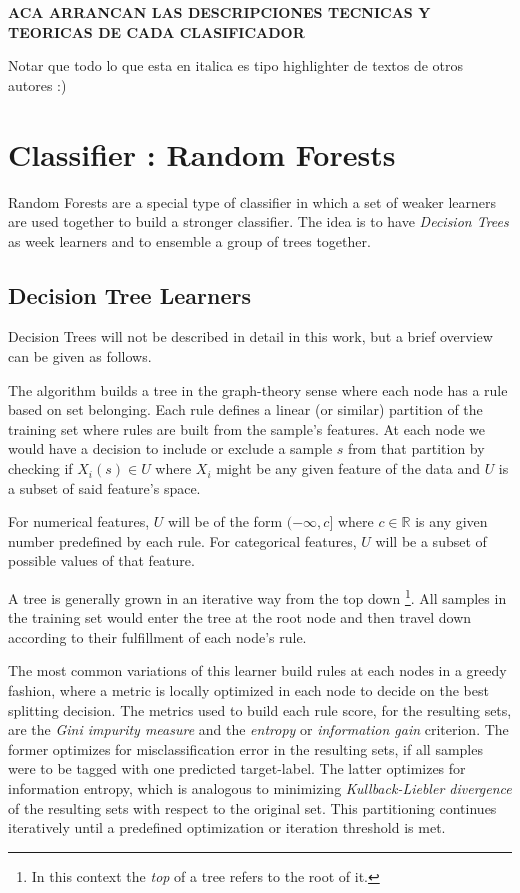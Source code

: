 \textbf{ACA ARRANCAN LAS DESCRIPCIONES TECNICAS Y TEORICAS DE CADA CLASIFICADOR}

Notar que todo lo que esta en italica es tipo highlighter de textos de otros autores :)


\section{Classifier : Random Forests}


Random Forests are a special type of classifier in which a set of weaker learners are used together to build a stronger classifier. The idea is to have \textit{Decision Trees} as week learners and to ensemble a group of trees together.

\subsection{Decision Tree Learners}

Decision Trees will not be described in detail in this work, but a brief overview can be given as follows. 

The algorithm builds a tree in the graph-theory sense where each node has a rule based on set belonging. Each rule defines a linear (or similar) partition of the training set where rules are built from the sample's features. At each node we would have a decision to include or exclude a sample $s$ from that partition by checking if $X_i(s) \in U$ where $X_i$ might be any given feature of the data and $U$ is a subset of said feature's space.

For numerical features, $U$ will be of the form $(-\infty,c]$ where $c \in \mathbb{R}$ is any given number predefined by each rule. For categorical features, $U$ will be a subset of possible values of that feature.

A tree is generally grown in an iterative way from the top down \footnote{In this context the \textit{top} of a tree refers to the root of it.}. All samples in the training set would enter the tree at the root node and then travel down according to their fulfillment of each node's rule. 

The most common variations of this learner build rules at each nodes in a greedy fashion, where a metric is locally optimized in each node to decide on the best splitting decision. The metrics used to build each rule score, for the resulting sets, are the \textit{Gini impurity measure} and the \textit{entropy} or \textit{information gain} criterion. The former optimizes for misclassification error in the resulting sets, if all samples were to be tagged with one predicted target-label. The latter optimizes for information entropy, which is analogous to minimizing \textit{Kullback-Liebler divergence} of the resulting sets with respect to the original set. This partitioning continues iteratively until a predefined optimization or iteration threshold is met. 

